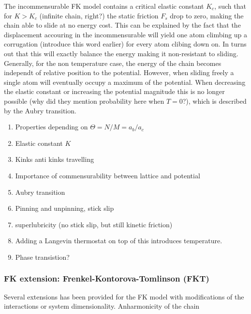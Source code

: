 The incommensurable FK model contains a critical elastic constant $K_c$, such that for $K > K_c$ (infinite chain, right?) the static friction $F_s$ drop to zero, making the chain able to slide at no energy cost. This can be explained by the fact that the displacement accouring in the incommensurable will yield one atom climbing up a corrugation (introduce this word earlier) for every atom clibing down on. In turns out that this will exactly balance the energy making it non-resistant to sliding. Generally, for the non temperature case, the energy of the chain becomes independt of relative position to the potential. However, when sliding freely a single atom will eventually occupy a maximum of the potential. When decreasing the elastic constant or increasing the potential magnitude this is no longer possible (why did they mention probability here when $T = 0$?), which is described by the Aubry transition.









\begin{enumerate}
  \item Properties depending on $\Theta = N/M = a_b/a_c$
  \item Elastic constant $K$
  \item Kinks anti kinks travelling
  \item Importance of commensurability between lattice and potential 
  \item Aubry transition
  \item Pinning and unpinning, stick slip
  \item superlubricity (no stick slip, but still kinetic friction)
  \item Adding a Langevin thermostat on top of this introduces temperature. 
  \item Phase transistion?
\end{enumerate}







\subsubsection{FK extension: Frenkel-Kontorova-Tomlinson (FKT)}

Several extensions has been provided for the FK model with modifications of the interactions or system dimensionality. Anharmonicity of the chain 


